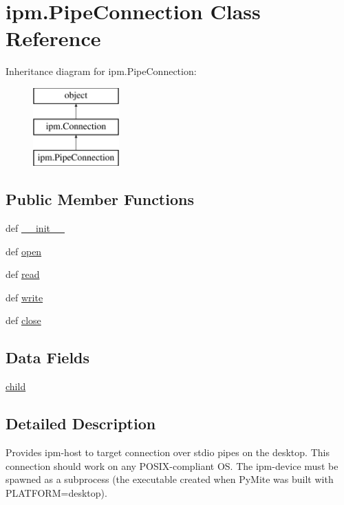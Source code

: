 \hypertarget{classipm_1_1_pipe_connection}{\section{ipm.\-Pipe\-Connection Class Reference}
\label{classipm_1_1_pipe_connection}
}
Inheritance diagram for ipm.\-Pipe\-Connection\-:\begin{figure}[H]
\begin{center}
\leavevmode
\includegraphics[height=3.000000cm]{classipm_1_1_pipe_connection}
\end{center}
\end{figure}
\subsection*{Public Member Functions}
\begin{DoxyCompactItemize}
\item 
def \hyperlink{classipm_1_1_pipe_connection_a77b684e3ec0bc86544c33e6441f91ab8}{\-\_\-\-\_\-init\-\_\-\-\_\-}
\item 
def \hyperlink{classipm_1_1_pipe_connection_aeb40c871a06f1bf71ced4b53f383fa06}{open}
\item 
def \hyperlink{classipm_1_1_pipe_connection_a852300f5138ddda94e5f1e301cd21987}{read}
\item 
def \hyperlink{classipm_1_1_pipe_connection_a09798e9d98387aae7562e237e8f3ab7b}{write}
\item 
def \hyperlink{classipm_1_1_pipe_connection_a938af222349384cd28d216cada1c96bc}{close}
\end{DoxyCompactItemize}
\subsection*{Data Fields}
\begin{DoxyCompactItemize}
\item 
\hyperlink{classipm_1_1_pipe_connection_a174259d834f32d25f7dc6bba7920efc8}{child}
\end{DoxyCompactItemize}


\subsection{Detailed Description}
\begin{DoxyVerb}Provides ipm-host to target connection over stdio pipes on the desktop.
This connection should work on any POSIX-compliant OS.
The ipm-device must be spawned as a subprocess
(the executable created when PyMite was built with PLATFORM=desktop).
\end{DoxyVerb}
 

